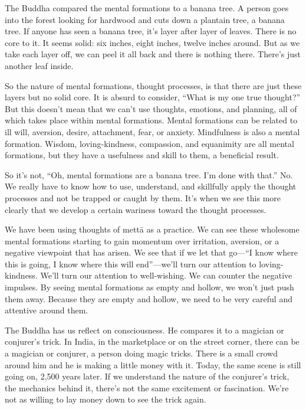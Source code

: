 The Buddha compared the mental formations to a banana tree. A person
goes into the forest looking for hardwood and cuts down a plantain tree,
a banana tree. If anyone has seen a banana tree, it’s layer after layer
of leaves. There is no core to it. It seems solid: six inches, eight
inches, twelve inches around. But as we take each layer off, we can peel
it all back and there is nothing there. There’s just another leaf
inside.

So the nature of mental formations, thought processes, is that there are
just these layers but no solid core. It is absurd to consider, “What is
my one true thought?” But this doesn’t mean that we can’t use thoughts,
emotions, and planning, all of which takes place within mental
formations. Mental formations can be related to ill will, aversion,
desire, attachment, fear, or anxiety. Mindfulness is also a mental
formation. Wisdom, loving-kindness, compassion, and equanimity are all
mental formations, but they have a usefulness and skill to them, a
beneficial result.

So it’s not, “Oh, mental formations are a banana tree. I’m done with
that.” No. We really have to know how to use, understand, and skillfully
apply the thought processes and not be trapped or caught by them. It’s
when we see this more clearly that we develop a certain wariness toward
the thought processes.

We have been using thoughts of mettā as a practice. We can see these
wholesome mental formations starting to gain momentum over irritation,
aversion, or a negative viewpoint that has arisen. We see that if we let
that go—“I know where this is going, I know where this will end”—we’ll
turn our attention to loving-kindness. We’ll turn our attention to
well-wishing. We can counter the negative impulses. By seeing mental
formations as empty and hollow, we won’t just push them away. Because
they are empty and hollow, we need to be very careful and attentive
around them.

The Buddha has us reflect on consciousness. He compares it to a magician
or conjurer’s trick. In India, in the marketplace or on the street
corner, there can be a magician or conjurer, a person doing magic
tricks. There is a small crowd around him and he is making a little
money with it. Today, the same scene is still going on, 2,500 years
later. If we understand the nature of the conjurer’s trick, the
mechanics behind it, there’s not the same excitement or fascination.
We’re not as willing to lay money down to see the trick again.

